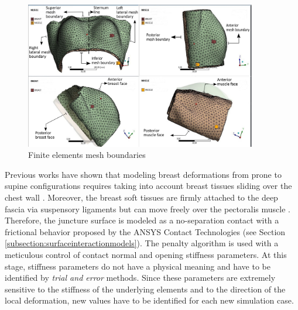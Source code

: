 \begin{figure}[!h]
\centering
\includegraphics[width=0.9\textwidth,keepaspectratio]{figures/mesh_parts_2.png} 
\caption{Finite elements mesh boundaries}\label{fig:meshboundaries}
\end{figure}

Previous works have shown that modeling breast deformations from prone to supine configurations requires taking into account breast tissues sliding over the chest wall \citep{carter_application_2012,han_nonlinear_2014}. Moreover, the breast soft tissues are firmly attached to the deep fascia via suspensory ligaments but can move freely over the pectoralis muscle  \citep{mugea2014aesthetic,clemente2011anatomy}.  Therefore, the juncture surface is modeled as a no-separation contact with a frictional behavior proposed by the ANSYS Contact Technologies (see Section \ref{subsection:surfaceinteractionmodels}). The penalty algorithm is used with a meticulous control of contact normal and opening stiffness parameters. At this stage, stiffness parameters do not have a physical meaning and have to be identified by \textit{trial and error} methods. Since these parameters are extremely sensitive to the stiffness of the underlying elements and to the direction of the local deformation, new values have to be identified for each new simulation case.    


